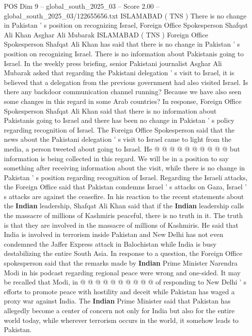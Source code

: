 \begin{textsample}{POS Dim 9 – global\_south\_2025\_03 – Score 2.00 – global\_south\_2025\_03/122655656.txt}  \label{ex:f9_pos_052}
ISLAMABAD ( TNS ) There is no change in Pakistan ' s position on recognizing Israel, Foreign Office Spokesperson Shafqat Ali Khan Asghar Ali Mubarak ISLAMABAD ( TNS ) Foreign Office Spokesperson Shafqat Ali Khan has said that there is no change in Pakistan ' s position on recognizing Israel.
There is no information about Pakistanis going to Israel.
In the weekly press briefing, senior Pakistani journalist Asghar Ali Mubarak asked that regarding the Pakistani delegation ' s visit to Israel, it is believed that a delegation from the previous government had also visited Israel.
Is there any backdoor communication channel running?
Because we have also seen some changes in this regard in some Arab countries?
In response, Foreign Office Spokesperson Shafqat Ali Khan said that there is no information about Pakistanis going to Israel and there has been no change in Pakistan ' s policy regarding recognition of Israel.
The Foreign Office Spokesperson said that the news about the Pakistani delegation ' s visit to Israel came to light from the media, a person tweeted about going to Israel.
He @ @ @ @ @ @ @ @ @ @ but information is being collected in this regard.
We will be in a position to say something after receiving information about the visit, while there is no change in Pakistan ' s position regarding recognition of Israel.
Regarding the Israeli attacks, the Foreign Office said that Pakistan condemns Israel ' s attacks on Gaza, Israel ' s attacks are against the ceasefire.
In his reaction to the recent statements about the \textbf{Indian} leadership, Shafqat Ali Khan said that if the \textbf{Indian} leadership calls the massacre of millions of Kashmiris peaceful, there is no truth in it.
The truth is that they are involved in the massacre of millions of Kashmiris.
He said that India is involved in terrorism inside Pakistan and New Delhi has not even condemned the Jaffer Express attack in Balochistan while India is busy destabilizing the entire South Asia.
In response to a question, the Foreign Office spokesperson said that the remarks made by \textbf{Indian} Prime Minister Narendra Modi in his podcast regarding regional peace were wrong and one-sided.
It may be recalled that Modi, in @ @ @ @ @ @ @ @ @ @ of responding to New Delhi ' s efforts to promote peace with hostility and deceit while Pakistan has waged a proxy war against India.
The \textbf{Indian} Prime Minister said that Pakistan has allegedly become a center of concern not only for India but also for the entire world today, while wherever terrorism occurs in the world, it somehow leads to Pakistan.

\end{textsample}
